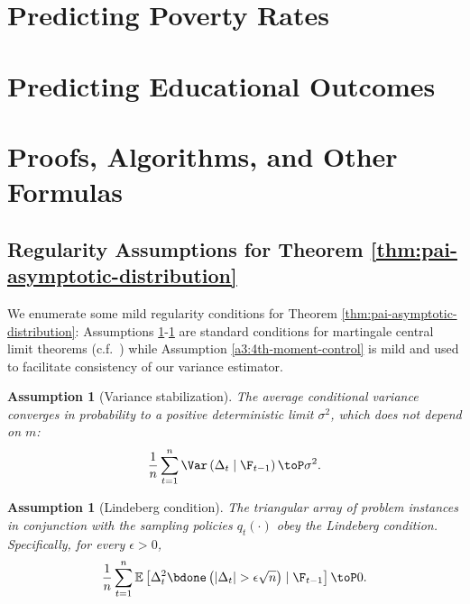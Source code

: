 \documentclass[11pt]{article}
\newtheorem{assumption}[theorem]{Assumption}
\begin{document}
\newpage

\section{Predicting Poverty Rates}

\section{Predicting Educational Outcomes}



\clearpage
\appendix

\section{Proofs, Algorithms, and Other Formulas}

\subsection{Regularity Assumptions for Theorem \ref{thm:pai-asymptotic-distribution}}
\label{regularity-assumptions:pai-thm}

We enumerate some mild regularity conditions for Theorem \ref{thm:pai-asymptotic-distribution}: Assumptions \ref{a1:variance_stabilization}-\ref{a2:lindeberg_condition} are standard conditions for martingale central limit theorems (c.f.~\citet[Corollary 3.2]{hall2014martingale}) while Assumption \ref{a3:4th-moment-control} is mild and used to facilitate consistency of our variance estimator.

\begin{assumption}[Variance stabilization]
\label{a1:variance_stabilization}
    The average conditional variance converges in probability to a positive deterministic limit $\sigma^2$, which does not depend on $m$:
    \begin{align*}
        \frac{1}{n} \sum_{t=1}^{n} \Var\left( \Delta_t \mid \F_{t-1} \right) \toP \sigma^2.
    \end{align*}
\end{assumption}

\begin{assumption}[Lindeberg condition]
\label{a2:lindeberg_condition}
    The triangular array of problem instances in conjunction with the sampling policies $q_t(\cdot)$ obey the Lindeberg condition. Specifically, for every $\epsilon > 0$,
    \begin{align*}
        \frac{1}{n} \sum_{t=1}^n \mathbb{E}\left[ \Delta^2_t \bdone\left( |\Delta_t| > \epsilon \sqrt{n} \right) \mid \F_{t-1} \right] \toP 0.
    \end{align*}
\end{assumption}
\end{document}
